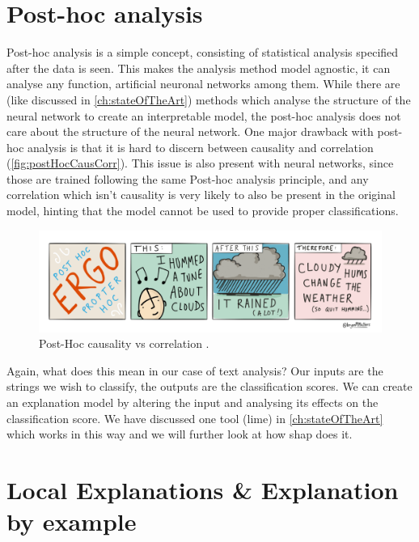 \section{Post-hoc analysis}

Post-hoc analysis is a simple concept, consisting of statistical analysis specified after the data is seen. This makes the analysis method model agnostic, it can analyse any function, artificial neuronal networks among them. While there are (like discussed in \autoref{ch:stateOfTheArt}) methods which analyse the structure of the neural network to create an interpretable model, the post-hoc analysis does not care about the structure of the neural network. One major drawback with post-hoc analysis is that it is hard to discern between causality and correlation (\autoref{fig:postHocCausCorr}). This issue is also present with neural networks, since those are trained following the same Post-hoc analysis principle, and any correlation which isn't causality is very likely to also be present in the original model, hinting that the model cannot be used to provide proper classifications.

\begin{figure}[H]
    \centering
    \includegraphics[width=\linewidth]{images/03_basics/Post-Hoc analysis.png}
    \caption{Post-Hoc causality vs correlation \cite{mathers_2017}.}
    \label{fig:postHocCausCorr}
\end{figure}


Again, what does this mean in our case of text analysis? Our inputs are the strings we wish to classify, the outputs are the classification scores. We can create an explanation model by altering the input and analysing its effects on the classification score. We have discussed one tool (lime) in \autoref{ch:stateOfTheArt} which works in this way and we will further look at how shap does it.

\section{Local Explanations \& Explanation by example}

